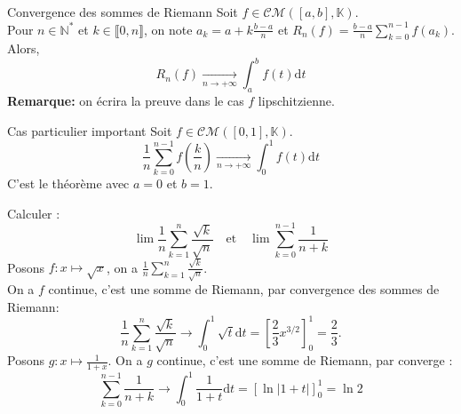 \documentclass[11pt]{article}
\newcommand*{\K}{\mathbb{K}}
\newcommand*{\N}{\mathbb{N}}
\newcommand*{\CM}{\mathcal{CM}}
\newcommand{\0}{\varnothing}
\newcommand*{\lb}{\llbracket}
\newcommand*{\rb}{\rrbracket}
\newcommand{\dt}{\textrm{d}t}
\begin{document}
\begin{thm}{Convergence des sommes de Riemann}{}
    Soit $f\in\CM([a,b], \K)$.\\
    Pour $n\in\N^*$ et $k\in\lb0,n\rb$, on note $a_k=a+k\frac{b-a}{n}$ et $R_n(f)=\frac{b-a}{n}\sum_{k=0}^{n-1}f(a_k)$. Alors,
    \begin{equation*}
        R_n(f)\xrightarrow[n\to+\infty]{}\int_a^bf(t)\dt
    \end{equation*}
    \tcblower
    \textbf{Remarque:} on écrira la preuve dans le cas $f$ lipschitzienne.
\end{thm}

\begin{corr}{Cas particulier important}{}
    Soit $f\in\CM([0,1], \K)$.
    \begin{equation*}
        \frac{1}{n}\sum_{k=0}^{n-1}f\left(\frac{k}{n}\right)\xrightarrow[n\to+\infty]{}\int_0^1f(t)\dt
    \end{equation*}
    \tcblower
    C'est le théorème avec $a=0$ et $b=1$.
\end{corr}

\begin{ex}{}{}
    Calculer :
    \begin{equation*}
        \lim\frac{1}{n}\sum_{k=1}^n\frac{\sqrt{k}}{\sqrt{n}} \quad \text{et}  \quad \lim\sum_{k=0}^{n-1}\frac{1}{n+k}
    \end{equation*}
    \tcblower
    Posons $f:x\mapsto\sqrt{x}$, on a $\frac{1}{n}\sum_{k=1}^n\frac{\sqrt{k}}{\sqrt{n}}$.\\
    On a $f$ continue, c'est une somme de Riemann, par convergence des sommes de Riemann:
    \begin{equation*}
        \frac{1}{n}\sum_{k=1}^n\frac{\sqrt{k}}{\sqrt{n}}\to\int_0^1\sqrt{t}\dt=\left[ \frac{2}{3}x^{3/2} \right]_0^1=\frac{2}{3}.
    \end{equation*}
    Posons $g:x\mapsto\frac{1}{1+x}$. On a $g$ continue, c'est une somme de Riemann, par converge :
    \begin{equation*}
        \sum_{k=0}^{n-1}\frac{1}{n+k}\to\int_0^1\frac{1}{1+t}\dt=\left[ \ln|1+t| \right]_0^1=\ln2
    \end{equation*}
\end{ex}
\end{document}
